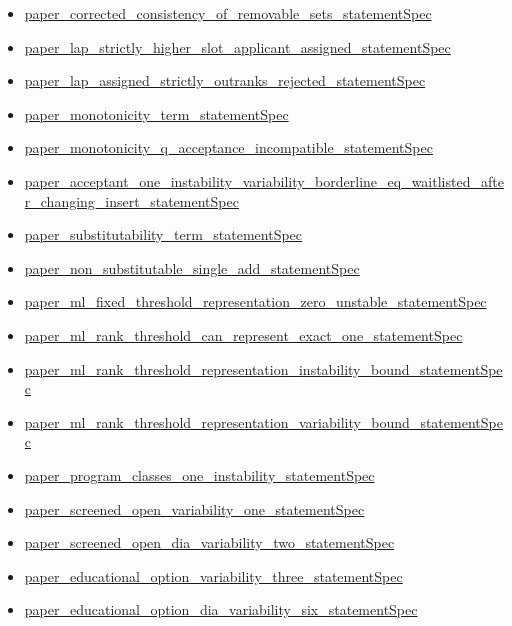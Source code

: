 \documentclass[10pt]{article}
\begin{document}
\begin{itemize}[leftmargin=1.2em]
\begin{itemize}[leftmargin=1.2em]
\item \hyperlink{source-claim-72ba750e0e18812e}{paper\_corrected\_consistency\_of\_removable\_sets\_statementSpec}
\item \hyperlink{source-claim-7d8732899c3f4210}{paper\_lap\_strictly\_higher\_slot\_applicant\_assigned\_statementSpec}
\item \hyperlink{source-claim-5e3bd8769e715d3c}{paper\_lap\_assigned\_strictly\_outranks\_rejected\_statementSpec}
\item \hyperlink{source-claim-14ff35045a22028c}{paper\_monotonicity\_term\_statementSpec}
\item \hyperlink{source-claim-43c4c9b7821d369a}{paper\_monotonicity\_q\_acceptance\_incompatible\_statementSpec}
\item \hyperlink{source-claim-f926138cb2114337}{paper\_acceptant\_one\_instability\_variability\_borderline\_eq\_waitlisted\_after\_changing\_insert\_statementSpec}
\item \hyperlink{source-claim-ef4d58145103cd0c}{paper\_substitutability\_term\_statementSpec}
\item \hyperlink{source-claim-ca2a099855204aca}{paper\_non\_substitutable\_single\_add\_statementSpec}
\item \hyperlink{source-claim-bc7eeffb236e6569}{paper\_ml\_fixed\_threshold\_representation\_zero\_unstable\_statementSpec}
\item \hyperlink{source-claim-d21050cec8d233b0}{paper\_ml\_rank\_threshold\_can\_represent\_exact\_one\_statementSpec}
\item \hyperlink{source-claim-47a9f492a25c4e98}{paper\_ml\_rank\_threshold\_representation\_instability\_bound\_statementSpec}
\item \hyperlink{source-claim-98ed151e7543b81d}{paper\_ml\_rank\_threshold\_representation\_variability\_bound\_statementSpec}
\item \hyperlink{source-claim-396063f8f4209701}{paper\_program\_classes\_one\_instability\_statementSpec}
\item \hyperlink{source-claim-f595f3e6af0e1b40}{paper\_screened\_open\_variability\_one\_statementSpec}
\item \hyperlink{source-claim-8afe5dc5804dcb73}{paper\_screened\_open\_dia\_variability\_two\_statementSpec}
\item \hyperlink{source-claim-68c8be83630deedf}{paper\_educational\_option\_variability\_three\_statementSpec}
\item \hyperlink{source-claim-a241fbe5321a55d3}{paper\_educational\_option\_dia\_variability\_six\_statementSpec}

\end{itemize}
\end{itemize}
\end{document}
